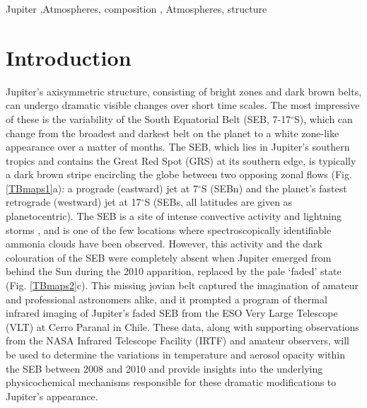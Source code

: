 \documentclass[final,5p,times,twocolumn,authoryear]{elsarticle}
\newcommand{\degree}{\ensuremath{^\circ}}
\begin{document}
\begin{frontmatter}
\begin{abstract}
\end{abstract}

\begin{keyword}
Jupiter \sep Atmospheres, composition \sep 
Atmospheres, structure


\end{keyword}

\end{frontmatter}


\section{Introduction}
\label{intro}

Jupiter's axisymmetric structure, consisting of bright zones and dark brown belts, can undergo dramatic visible changes over short time scales.  The most impressive of these is the variability of the South Equatorial Belt (SEB, 7-17\degree S), which can change from the broadest and darkest belt on the planet to a white zone-like appearance over a matter of months.  The SEB, which lies in Jupiter's southern tropics and contains the Great Red Spot (GRS) at its southern edge, is typically a dark brown stripe encircling the globe between two opposing zonal flows (Fig. \ref{TBmaps1}a):  a prograde (eastward) jet at 7\degree S (SEBn) and the planet's fastest retrograde (westward) jet at 17\degree S (SEBs, all latitudes are given as planetocentric).   The SEB is a site of intense convective activity and lightning storms \citep{04ingersoll}, and is one of the few locations where spectroscopically identifiable ammonia clouds \citep[SIACs, ][]{02baines} have been observed.   However, this activity and the dark colouration of the SEB were completely absent when Jupiter emerged from behind the Sun during the 2010 apparition, replaced by the pale `faded' state (Fig. \ref{TBmaps2}c).  This missing jovian belt captured the imagination of amateur and professional astronomers alike, and it prompted a program of thermal infrared imaging of Jupiter's faded SEB from the ESO Very Large Telescope (VLT) at Cerro Paranal in Chile.  These data, along with supporting observations from the NASA Infrared Telescope Facility (IRTF) and amateur observers, will be used to determine the variations in temperature and aerosol opacity within the SEB between 2008 and 2010 and provide insights into the underlying physicochemical mechanisms responsible for these dramatic modifications to Jupiter's appearance.
\end{document}
